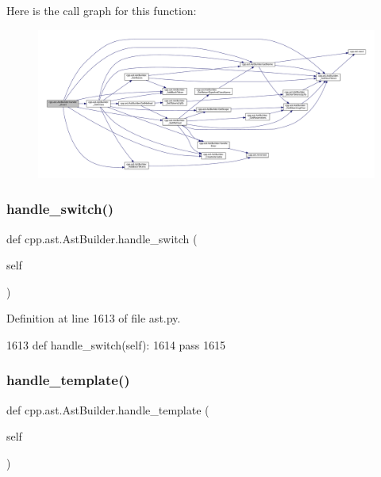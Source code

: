Here is the call graph for this function\+:
\nopagebreak
\begin{figure}[H]
\begin{center}
\leavevmode
\includegraphics[width=350pt]{classcpp_1_1ast_1_1AstBuilder_aadfad5b8d50962c04504e806dc0f5b6c_cgraph}
\end{center}
\end{figure}
\mbox{\label{classcpp_1_1ast_1_1AstBuilder_a1dffcdf7154158461a652c5b885bfa19}} 
\subsubsection{\texorpdfstring{handle\+\_\+switch()}{handle\_switch()}}
{\footnotesize\ttfamily def cpp.\+ast.\+Ast\+Builder.\+handle\+\_\+switch (\begin{DoxyParamCaption}\item[{}]{self }\end{DoxyParamCaption})}



Definition at line 1613 of file ast.\+py.


\begin{DoxyCode}
1613     \textcolor{keyword}{def }handle\_switch(self):
1614         \textcolor{keywordflow}{pass}
1615 
\end{DoxyCode}
\mbox{\label{classcpp_1_1ast_1_1AstBuilder_a0f4d74520697ec05eb6b549daada5a5d}} 
\subsubsection{\texorpdfstring{handle\+\_\+template()}{handle\_template()}}
{\footnotesize\ttfamily def cpp.\+ast.\+Ast\+Builder.\+handle\+\_\+template (\begin{DoxyParamCaption}\item[{}]{self }\end{DoxyParamCaption})}



